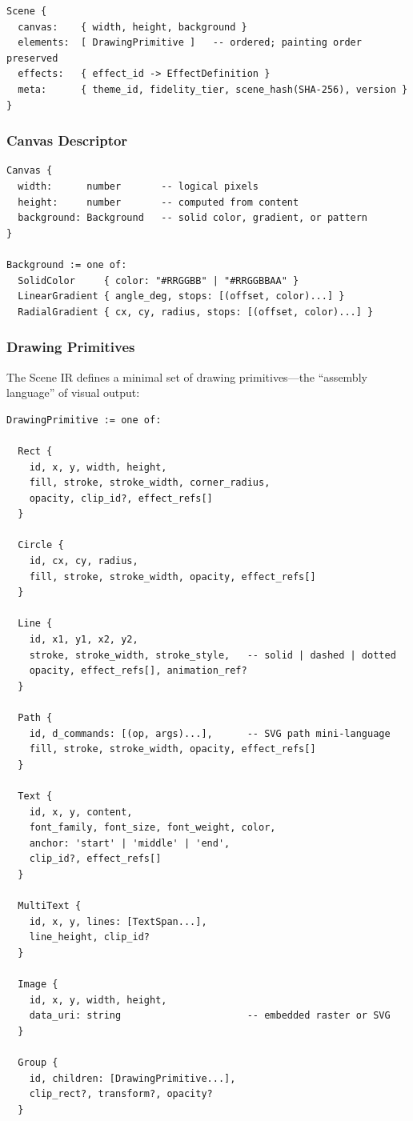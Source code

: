 \begin{Verbatim}[frame=single,fontsize=\small]
Scene {
  canvas:    { width, height, background }
  elements:  [ DrawingPrimitive ]   -- ordered; painting order preserved
  effects:   { effect_id -> EffectDefinition }
  meta:      { theme_id, fidelity_tier, scene_hash(SHA-256), version }
}
\end{Verbatim}

\subsubsection{Canvas Descriptor}

\begin{Verbatim}[frame=single,fontsize=\small]
Canvas {
  width:      number       -- logical pixels
  height:     number       -- computed from content
  background: Background   -- solid color, gradient, or pattern
}

Background := one of:
  SolidColor     { color: "#RRGGBB" | "#RRGGBBAA" }
  LinearGradient { angle_deg, stops: [(offset, color)...] }
  RadialGradient { cx, cy, radius, stops: [(offset, color)...] }
\end{Verbatim}

\subsubsection{Drawing Primitives}

The Scene IR defines a minimal set of drawing primitives---the ``assembly language'' of visual output:

\begin{Verbatim}[frame=single,fontsize=\small]
DrawingPrimitive := one of:

  Rect {
    id, x, y, width, height,
    fill, stroke, stroke_width, corner_radius,
    opacity, clip_id?, effect_refs[]
  }

  Circle {
    id, cx, cy, radius,
    fill, stroke, stroke_width, opacity, effect_refs[]
  }

  Line {
    id, x1, y1, x2, y2,
    stroke, stroke_width, stroke_style,   -- solid | dashed | dotted
    opacity, effect_refs[], animation_ref?
  }

  Path {
    id, d_commands: [(op, args)...],      -- SVG path mini-language
    fill, stroke, stroke_width, opacity, effect_refs[]
  }

  Text {
    id, x, y, content,
    font_family, font_size, font_weight, color,
    anchor: 'start' | 'middle' | 'end',
    clip_id?, effect_refs[]
  }

  MultiText {
    id, x, y, lines: [TextSpan...],
    line_height, clip_id?
  }

  Image {
    id, x, y, width, height,
    data_uri: string                      -- embedded raster or SVG
  }

  Group {
    id, children: [DrawingPrimitive...],
    clip_rect?, transform?, opacity?
  }
\end{Verbatim}

